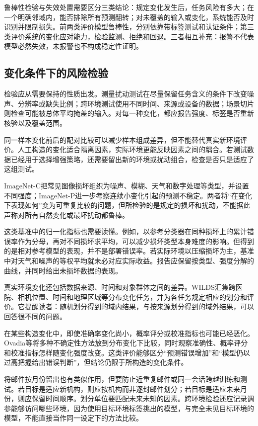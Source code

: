 鲁棒性检验与失效处置需要区分三类结论：规定变化发生后，任务风险有多大；在一个明确邻域内，能否排除所有预测翻转；对未覆盖的输入或变化，系统能否及时识别并限制损失。前两类评价模型鲁棒性，分别依靠带标签测试和认证条件；第三类评价系统的变化应对能力，检验监测、拒绝和回退。三者相互补充：报警不代表模型必然失效，未报警也不构成稳定性证明。

\subsection{变化条件下的风险检验}
\label{sec:robustness-risk-test}

检验应从需要保持的性质出发。测量扰动测试在尽量保留任务含义的条件下改变噪声、分辨率或缺失比例；跨环境测试使用不同时间、来源或设备的数据；场景切片则检查可能被总体平均掩盖的输入。对每一种变化，都应报告强度、标签是否重新核验以及覆盖范围。

同一样本变化前后的配对比较可以减少样本组成差异，但不能替代真实新环境评价。人工构造的变化适合隔离因素，实际环境更能反映因素之间的耦合。若测试数据已经用于选择增强策略，还需要留出新的环境或扰动组合，检查是否只是适应了这组测试。

ImageNet-C把常见图像损坏组织为噪声、模糊、天气和数字处理等类型，并设置不同强度；ImageNet-P进一步考察连续小变化引起的预测不稳定。两者将“在变化下表现如何”变为可重复比较的问题，但所检验的是规定的损坏和扰动，不能据此声称对所有自然变化或最坏扰动都鲁棒。

这类基准中的归一化指标也需要读懂。例如，以参考分类器在同种损坏上的累计错误率作为分母，再对不同损坏求平均，可以减少损坏类型本身难度的影响。但得到的是相对参考模型的表现，并不是部署错误率。若实际环境以压缩损坏为主，基准中对天气和噪声的等权平均就未必对应实际收益。报告应保留按类型、强度分解的曲线，并同时给出未损坏数据的表现。

真实环境变化还包括数据来源、时间和对象群体之间的差异。WILDS汇集跨医院、相机位置、时间和地理区域等分布变化任务，并为各任务规定相应的划分和评价。它提醒读者：随机划分得到的域内结果，与按来源划分得到的域外结果，可以回答很不同的问题。

\Needspace{45mm}
在某些构造变化中，即使准确率变化尚小，概率评分或校准指标也可能已经恶化。Ovadia等将多种不确定性方法放到分布变化下比较，同时观察准确性、概率评分和校准指标怎样随变化强度改变。这类评价能够区分“预测错误增加”和“模型仍以过高把握给出错误判断”，但结论仍限于所构造的变化条件。

将邮件按月份留出也有类似作用，但要防止近重复邮件或同一会话跨越训练和测试。若目标是适应新机构，则应按机构而非逐封邮件划分；若目标是适应未来月份，则应保留时间顺序。划分单位要匹配未来未知的因素。跨环境检验还应记录调参能够访问哪些环境，因为使用目标环境标签挑出的模型，与完全未见目标环境的模型，不能直接当作同一设定下的方法比较。

